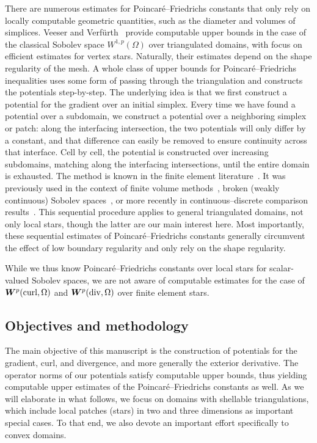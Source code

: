 \documentclass[10pt,a4paper]{article}
\begin{document}
There are numerous estimates for Poincar\'e--Friedrichs constants that only rely on locally computable geometric quantities, such as the diameter and volumes of simplices. 
Veeser and Verf\"urth~\cite{veeser2012poincare} provide computable upper bounds in the case of the classical Sobolev space $W^{1,p}(\Omega)$ over triangulated domains, with focus on efficient estimates for vertex stars. Naturally, their estimates depend on the shape regularity of the mesh.
A whole class of upper bounds for Poincar\'e--Friedrichs inequalities uses some form of passing through the triangulation and constructs the potentials step-by-step. 
The underlying idea is that we first construct a potential for the gradient over an initial simplex. 
Every time we have found a potential over a subdomain, we construct a potential over a neighboring simplex or patch:
along the interfacing intersection, the two potentials will only differ by a constant, 
and that difference can easily be removed to ensure continuity across that interface. 
Cell by cell, the potential is constructed over increasing subdomains, matching along the interfacing intersections, until the entire domain is exhausted.  
The method is known in the finite element literature~\cite{ern2021finite}. It was previously used in the context of finite volume methods~\cite{Eym_Gal_Her_00}, broken (weakly continuous) Sobolev spaces~\cite{vohralik2005discrete}, or more recently in continuous--discrete comparison results~\cite{Brae_Pill_Sch_p_rob_09, ern2020stable, Chaum_Voh_p_rob_3D_H_curl_24,  Voh_loc_glob_H1_24}. 
This sequential procedure applies to general triangulated domains, not only local stars, though the latter are our main interest here. 
Most importantly, these sequential estimates of Poincar\'e--Friedrichs constants generally circumvent the effect of low boundary regularity and only rely on the shape regularity. 

While we thus know Poincar\'e--Friedrichs constants over local stars for scalar-valued Sobolev spaces, 
we are not aware of computable estimates for the case of $\bm{W}^{p}(\operatorname{curl},\Omega)$ and $\bm{W}^{p}(\operatorname{div},\Omega)$ over finite element stars. 






\subsection{Objectives and methodology}

The main objective of this manuscript is the construction of potentials for the gradient, curl, and divergence, and more generally the exterior derivative. 
The operator norms of our potentials satisfy computable upper bounds, thus yielding computable upper estimates of the Poincar\'e--Friedrichs constants as well. 
As we will elaborate in what follows, we focus on domains with shellable triangulations, which include local patches (stars) in two and three dimensions as important special cases. 
To that end, we also devote an important effort specifically to convex domains. 
\end{document}
